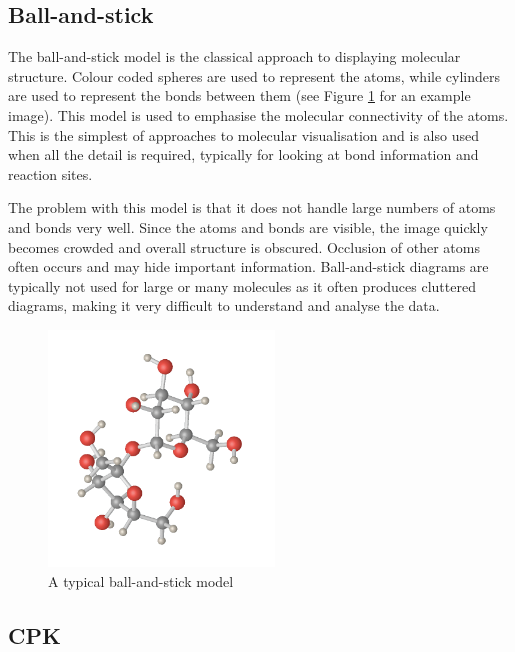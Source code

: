 
\subsection{Ball-and-stick}
\label{sub:background_ballstick}

The ball-and-stick model is the classical approach to displaying molecular
structure. Colour coded spheres are used to represent the atoms, while
cylinders are used to represent the bonds between them (see Figure
\ref{fig:background_ballstick} for an example image). This model is used to
emphasise the molecular connectivity of the atoms. This is the simplest of
approaches to molecular visualisation and is also used when all the detail is
required, typically for looking at bond information and reaction sites.

The problem with this model is that it does not handle large numbers of atoms
and bonds very well. Since the atoms and bonds are visible, the image quickly
becomes crowded and overall structure is obscured. Occlusion of other atoms
often occurs and may hide important information. Ball-and-stick diagrams are
typically not used for large or many molecules as it often produces cluttered
diagrams, making it very difficult to understand and analyse the data.

\begin{figure}[h!]
  \begin{center}
    \includegraphics[width=60mm]{ballstick}
  \end{center}
  \caption{A typical ball-and-stick model}
  \label{fig:background_ballstick}
\end{figure}


\subsection{CPK}
\label{sub:background_cpk}


